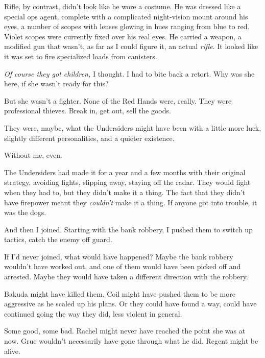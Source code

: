 Rifle, by contrast, didn't look like he wore a costume.  He was dressed like a special ops agent, complete with a complicated night-vision mount around his eyes, a number of scopes with lenses glowing in hues ranging from blue to red.  Violet scopes were currently fixed over his real eyes.  He carried a weapon, a modified gun that wasn't, as far as I could figure it, an actual \emph{rifle}.  It looked like it was set to fire specialized loads from canisters.



\emph{Of course they got children, }I thought.  I had to bite back a retort.  Why was she here, if she wasn't ready for this?



But she wasn't a fighter.  None of the Red Hands were, really.  They were professional thieves.  Break in, get out, sell the goods.



They were, maybe, what the Undersiders might have been with a little more luck, slightly different personalities, and a quieter existence.



Without me, even.



The Undersiders had made it for a year and a few months with their original strategy, avoiding fights, slipping away, staying off the radar.  They would fight when they had to, but they didn't make it a thing.  The fact that they didn't have firepower meant they \emph{couldn't} make it a thing.  If anyone got into trouble, it was the dogs.



And then I joined.  Starting with the bank robbery, I pushed them to switch up tactics, catch the enemy off guard.



If I'd never joined, what would have happened?  Maybe the bank robbery wouldn't have worked out, and one of them would have been picked off and arrested.  Maybe they would have taken a different direction with the robbery.



Bakuda might have killed them, Coil might have pushed them to be more aggressive as he scaled up his plans.  Or they could have found a way, could have continued going the way they did, less violent in general.



Some good, some bad.  Rachel might never have reached the point she was at now.  Grue wouldn't necessarily have gone through what he did.  Regent might be alive.



